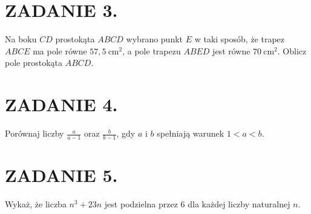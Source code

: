 \documentclass[10pt]{article}
\begin{document}
\section*{ZADANIE 3.}
Na boku \(C D\) prostokąta \(A B C D\) wybrano punkt \(E\) w taki sposób, że trapez \(A B C E\) ma pole równe \(57,5 \mathrm{~cm}^{2}\), a pole trapezu \(A B E D\) jest równe \(70 \mathrm{~cm}^{2}\). Oblicz pole prostokąta \(A B C D\).

\section*{ZADANIE 4.}
Porównaj liczby \(\frac{a}{a-1}\) oraz \(\frac{b}{b-1}\), gdy \(a\) i \(b\) spełniają warunek \(1<a<b\).

\section*{ZADANIE 5.}
Wykaż, że liczba \(n^{3}+23 n\) jest podzielna przez 6 dla każdej liczby naturalnej \(n\).
\end{document}
